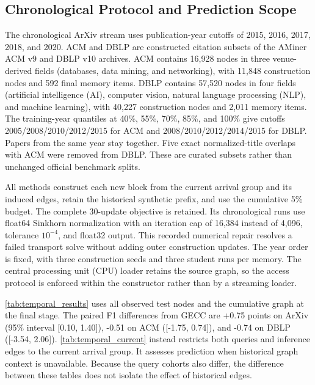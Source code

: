 \subsection{Chronological Protocol and Prediction Scope}
\label{app:temporal_setting}

The chronological ArXiv stream uses publication-year cutoffs of 2015,
2016, 2017, 2018, and 2020. ACM and DBLP are constructed citation subsets
of the AMiner ACM v9 and DBLP v10 archives. ACM contains 16,928 nodes in
three venue-derived fields (databases, data mining, and networking), with
11,848 construction nodes and 592 final memory items. DBLP contains
57,520 nodes in four fields (artificial intelligence (AI), computer vision,
natural language processing (NLP), and machine learning), with 40,227
construction nodes and 2,011 memory items.
The training-year quantiles at 40\%, 55\%, 70\%, 85\%, and 100\%
give cutoffs 2005/2008/2010/2012/2015 for ACM and
2008/2010/2012/2014/2015 for DBLP. Papers from the same year stay
together. Five exact normalized-title overlaps with ACM were removed
from DBLP. These are curated subsets rather than unchanged official
benchmark splits.

All methods construct each new block from the current arrival group
and its induced edges, retain the historical synthetic prefix, and use
the cumulative 5\% budget. The complete 30-update \method{} objective
is retained. Its chronological runs use float64 Sinkhorn normalization
with an iteration cap of 16,384 instead of 4,096, tolerance $10^{-4}$,
and float32 output. This recorded numerical repair resolves a failed
transport solve without adding outer construction updates.
The year order is fixed, with three construction seeds and three
student runs per memory. The central processing unit (CPU) loader retains the source graph, so
the access protocol is enforced within the constructor rather than by
a streaming loader.

\autoref{tab:temporal_results} uses all observed test nodes and the
cumulative graph at the final stage. The paired F1 differences from
GECC are +0.75 points on ArXiv (95\% interval [0.10, 1.40]),
-0.51 on ACM ([-1.75, 0.74]), and -0.74 on DBLP ([-3.54, 2.06]).
\autoref{tab:temporal_current} instead restricts both queries and
inference edges to the current arrival group. It assesses prediction
when historical graph context is unavailable. Because the query
cohorts also differ, the difference between these tables does not
isolate the effect of historical edges.

